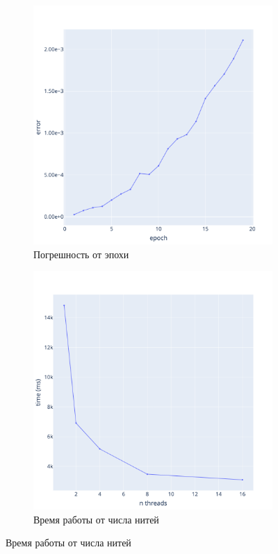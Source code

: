 \documentclass[a4paper,hidelinks,12pt]{article}
\begin{document}
\begin{figure}[H]
\begin{subfigure}{.5\textwidth}
  \centering
  \includegraphics[width=\linewidth]{pictures/L1_128_err.png}
  \caption{Погрешность от эпохи}
\end{subfigure}%
\begin{subfigure}{.5\textwidth}
  \centering
  \includegraphics[width=\linewidth]{pictures/L1_128_time_threads.png}
  \caption{Время работы от числа нитей}
\end{subfigure}%
\end{figure}
\end{document}

